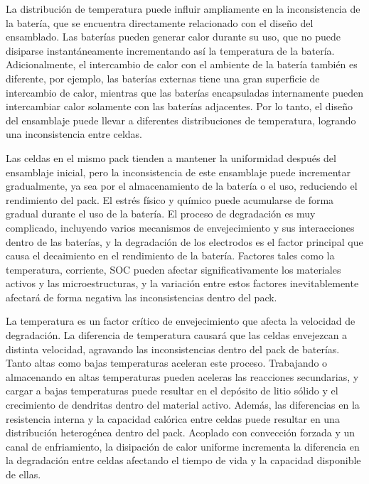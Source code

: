\documentclass[10pt,a4paper]{article}
\newcounter{subsubsubsection}[subsubsection]
\begin{document}
La distribuci\'on de temperatura puede influir ampliamente en la inconsistencia
de la bater\'ia, que se encuentra directamente relacionado con el diseño del
ensamblado. Las bater\'ias pueden generar calor durante su uso, que no puede
disiparse instant\'aneamente incrementando as\'i la temperatura de la bater\'ia.
Adicionalmente, el intercambio de calor con el ambiente de la bater\'ia
tambi\'en es diferente, por ejemplo, las bater\'ias externas tiene una gran
superficie de intercambio de calor, mientras que las bater\'ias encapsuladas
internamente pueden intercambiar calor solamente con las bater\'ias adjacentes.
Por lo tanto, el diseño del ensamblaje puede llevar a diferentes distribuciones
de temperatura, logrando una inconsistencia entre celdas.


Las celdas en el mismo pack tienden a mantener la uniformidad despu\'es del
ensamblaje inicial, pero la inconsistencia de este ensamblaje puede incrementar
gradualmente, ya sea por el almacenamiento de la bater\'ia o el uso, reduciendo
el rendimiento del pack. El estr\'es f\'isico y qu\'imico puede acumularse
de forma gradual durante el uso de la bater\'ia. El proceso de degradaci\'on es
muy complicado, incluyendo varios mecanismos de envejecimiento y sus
interacciones dentro de las bater\'ias, y la degradaci\'on de los electrodos es
el factor principal que causa el decaimiento en el rendimiento de la bater\'ia.
Factores tales como la temperatura, corriente, \acrshort{SOC} pueden afectar
significativamente los materiales activos y las microestructuras, y la
variaci\'on entre estos factores inevitablemente afectar\'a de forma negativa
las inconsistencias dentro del pack.

La temperatura es un factor cr\'itico de envejecimiento que afecta la velocidad
de degradaci\'on. La diferencia de temperatura causar\'a que las celdas
envejezcan a distinta velocidad, agravando las inconsistencias dentro del pack
de bater\'ias. Tanto altas como bajas temperaturas aceleran este proceso.
Trabajando o almacenando en altas temperaturas pueden aceleras las reacciones
secundarias, y cargar a bajas temperaturas puede resultar en el dep\'osito de
litio s\'olido y el crecimiento de dendritas dentro del material activo.
Adem\'as, las diferencias en la resistencia interna y la capacidad cal\'orica
entre celdas puede resultar en una distribuci\'on heterog\'enea dentro del pack.
Acoplado con convecci\'on forzada y un canal de enfriamiento, la disipaci\'on de
calor uniforme incrementa la diferencia en la degradaci\'on entre celdas
afectando el tiempo de vida y la capacidad disponible de ellas. 
\end{document}

